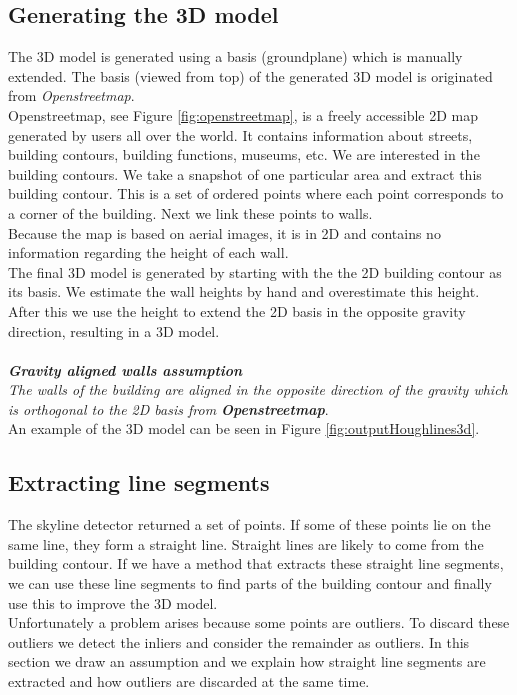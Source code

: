 \subsection{Generating the 3D model}
The 3D model is generated using a basis (groundplane) which is manually extended.
The basis (viewed from top) of the generated 3D model is originated from
\emph{Openstreetmap}.\\
Openstreetmap, see Figure \ref{fig:openstreetmap}, is a freely accessible 2D map generated by
users all over the world. It contains information about streets, building
contours, building functions, museums, etc.  We are interested in the building
contours.  We take a snapshot of one particular area and extract this building
contour.  This is a set of ordered points where each point corresponds to a
corner of the building.  Next we link these points to walls.\\ 
Because the map is based on aerial images, it is in 2D and contains no
information regarding the height of each wall.  \\
The final 3D model is generated by starting with the the 2D building contour as
its basis. We estimate the wall heights by hand and overestimate this height.
After this we use the height to extend the 2D basis in the opposite gravity direction,
resulting in a 3D model.\\\\
\textbf{\emph{Gravity aligned walls assumption}}\\
	\emph{The walls of the building are aligned in the opposite direction of the gravity
	which is orthogonal to the 2D basis from \textbf{Openstreetmap}}.\\

An example of the 3D model can be seen in Figure \ref{fig:outputHoughlines3d}.

\subsection{Extracting line segments}
\label{extractinglinesegments}
	The skyline detector returned a set of points. If some of these points lie
	on the same line, they form a straight line.  Straight lines are likely to
	come from the building contour. If we have a method that extracts these
	straight line segments, we can use these line segments to find parts of the
	building contour and finally use this to improve the 3D model.\\
	Unfortunately a problem arises because some points are outliers. To discard these outliers
	we detect the inliers and consider the remainder as outliers.  In this
	section we draw an assumption and we explain how straight line segments are extracted and how
	outliers are discarded at the same time.\\


